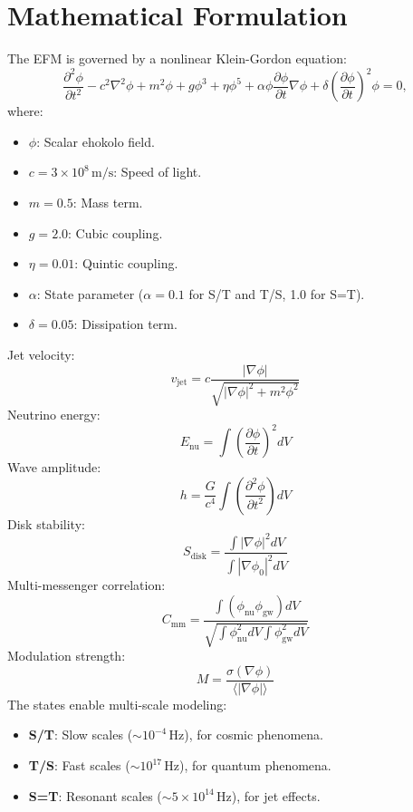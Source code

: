 \documentclass[11pt]{article}
\begin{document}
\section{Mathematical Formulation}
The EFM is governed by a nonlinear Klein-Gordon equation:
\begin{equation}
\frac{\partial^2 \phi}{\partial t^2} - c^2 \nabla^2 \phi + m^2 \phi + g \phi^3 + \eta \phi^5 + \alpha \phi \frac{\partial \phi}{\partial t} \nabla \phi + \delta \left(\frac{\partial \phi}{\partial t}\right)^2 \phi = 0,
\end{equation}
where:
\begin{itemize}
    \item \(\phi\): Scalar ehokolo field.
    \item \(c = 3 \times 10^8 \, \text{m/s}\): Speed of light.
    \item \(m = 0.5\): Mass term.
    \item \(g = 2.0\): Cubic coupling.
    \item \(\eta = 0.01\): Quintic coupling.
    \item \(\alpha\): State parameter (\(\alpha = 0.1\) for S/T and T/S, 1.0 for S=T).
    \item \(\delta = 0.05\): Dissipation term.
\end{itemize}
Jet velocity:
\begin{equation}
v_{\text{jet}} = c \frac{|\nabla \phi|}{\sqrt{|\nabla \phi|^2 + m^2 \phi^2}}
\end{equation}
Neutrino energy:
\begin{equation}
E_{\text{nu}} = \int \left( \frac{\partial \phi}{\partial t} \right)^2 dV
\end{equation}
Wave amplitude:
\begin{equation}
h = \frac{G}{c^4} \int \left( \frac{\partial^2 \phi}{\partial t^2} \right) dV
\end{equation}
Disk stability:
\begin{equation}
S_{\text{disk}} = \frac{\int |\nabla \phi|^2 dV}{\int |\nabla \phi_0|^2 dV}
\end{equation}
Multi-messenger correlation:
\begin{equation}
C_{\text{mm}} = \frac{\int (\phi_{\text{nu}} \phi_{\text{gw}}) dV}{\sqrt{\int \phi_{\text{nu}}^2 dV \int \phi_{\text{gw}}^2 dV}}
\end{equation}
Modulation strength:
\begin{equation}
M = \frac{\sigma(\nabla \phi)}{\langle |\nabla \phi| \rangle}
\end{equation}
The states enable multi-scale modeling:
\begin{itemize}
    \item \textbf{S/T}: Slow scales (\(\sim 10^{-4} \, \text{Hz}\)), for cosmic phenomena.
    \item \textbf{T/S}: Fast scales (\(\sim 10^{17} \, \text{Hz}\)), for quantum phenomena.
    \item \textbf{S=T}: Resonant scales (\(\sim 5 \times 10^{14} \, \text{Hz}\)), for jet effects.
\end{itemize}
\end{document}
